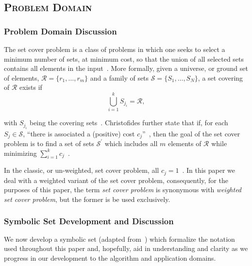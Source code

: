 \documentclass[conference]{IEEEtran}
\begin{document}
\subsection{\textsc{Problem Domain}} \label{sec:problemDomain}

\subsubsection{Problem Domain Discussion}

The set cover problem is a class of problems in which one seeks to select a
minimum number of sets, at minimum cost, so that the union of all selected sets
contains all elements in the input~\cite{stern2006}.  More formally, given a
universe, or ground set of elements, ${\mathcal{R} = \lbrace r_1,\ldots,r_m
\rbrace}$ and a family of sets ${\mathcal{S} = \lbrace S_1,\ldots,S_N
\rbrace}$, a set covering of $\mathcal{R}$ exists if \[ \bigcup\limits_{i =
1}^k S_{j_i} = \mathcal{R},\]

\noindent with $S_{j_i}$ being the covering sets~\cite[pp.
39-40]{christofides1975}. Christofides further state that if, for each $S_j \in
\mathcal{S}$, ``there is associated a (positive) cost $c_j$''~\cite[p.
39]{christofides1975}, then the goal of the set cover problem is to find a set
of sets $\mathcal{S}^\prime$ which includes all $m$ elements of $\mathcal{R}$
while minimizing $\sum_{i = 1}^k c_j$~\cite{christofides1975, stern2006,
talbi2009, wiki:SCP}. 

In the classic, or un-weighted, set cover problem, all ${c_j =
1}$~\cite{stern2006}. In this paper we deal with a weighted variant of the set
cover problem, consequently, for the purposes of this paper, the term
\textit{set cover problem} is synonymous with \textit{weighted set cover
problem}, but the former is be used exclusively.

\subsubsection{Symbolic Set Development and Discussion} \label{sec:symbol} We
now develop a symbolic set (adapted from~\cite{christofides1975, lamontSCP})
which formalize the notation used throughout this paper and, hopefully, aid in
understanding and clarity as we progress in our development to the algorithm
and application domains.
\end{document}
